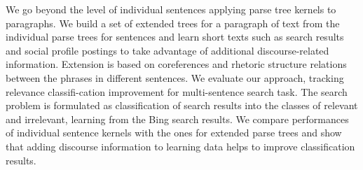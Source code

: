 We go beyond the level of individual sentences applying parse tree kernels to paragraphs. We build a set of extended trees for a paragraph of text from the individual parse trees for sentences and learn short texts such as search results and social profile postings to take advantage of additional discourse-related information. Extension is based on coreferences and rhetoric structure relations between the phrases in different sentences. We evaluate our approach, tracking relevance classifi-cation improvement for multi-sentence search task. The search problem is formulated as classification of search results into the classes of relevant and irrelevant, learning from the Bing search results. We compare performances of individual sentence kernels with the ones for extended parse trees and show that adding discourse information to learning data helps to improve classification results.
